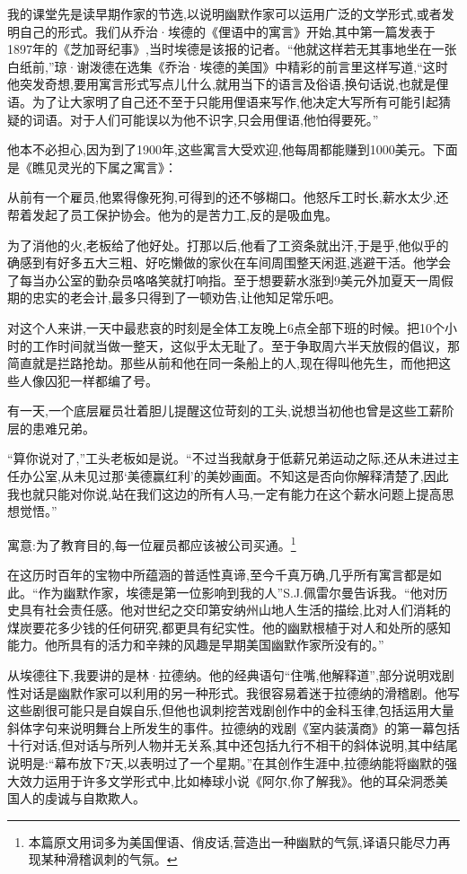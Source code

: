 我的课堂先是读早期作家的节选,以说明幽默作家可以运用广泛的文学形式,或者发明自己的形式。我们从乔治·埃德的《俚语中的寓言》开始,其中第一篇发表于1897年的《芝加哥纪事》,当时埃德是该报的记者。“他就这样若无其事地坐在一张白纸前,”琼·谢泼德在选集《乔治·埃德的美国》中精彩的前言里这样写道,“这时他突发奇想,要用寓言形式写点儿什么,就用当下的语言及俗语,换句话说,也就是俚语。为了让大家明了自己还不至于只能用俚语来写作,他决定大写所有可能引起猜疑的词语。对于人们可能误以为他不识字,只会用俚语,他怕得要死。”

他本不必担心,因为到了1900年,这些寓言大受欢迎,他每周都能赚到1000美元。下面是《瞧见灵光的下属之寓言》：

从前有一个雇员,他累得像死狗,可得到的还不够糊口。他怒斥工时长,薪水太少,还帮着发起了员工保护协会。他为的是苦力工,反的是吸血鬼。

为了消他的火,老板给了他好处。打那以后,他看了工资条就出汗,于是乎,他似乎的确感到有好多五大三粗、好吃懒做的家伙在车间周围整天闲逛,逃避干活。他学会了每当办公室的勤杂员咯咯笑就打响指。至于想要薪水涨到9美元外加夏天一周假期的忠实的老会计,最多只得到了一顿劝告,让他知足常乐吧。

对这个人来讲,一天中最悲哀的时刻是全体工友晚上6点全部下班的时候。把10个小时的工作时间就当做一整天，这似乎太无耻了。至于争取周六半天放假的倡议，那简直就是拦路抢劫。那些从前和他在同一条船上的人,现在得叫他先生，而他把这些人像囚犯一样都编了号。

有一天,一个底层雇员壮着胆儿提醒这位苛刻的工头,说想当初他也曾是这些工薪阶层的患难兄弟。

“算你说对了,”工头老板如是说。“不过当我献身于低薪兄弟运动之际,还从未进过主任办公室,从未见过那‘美德赢红利’的美妙画面。不知这是否向你解释清楚了,因此我也就只能对你说,站在我们这边的所有人马,一定有能力在这个薪水问题上提高思想觉悟。”

寓意:为了教育目的,每一位雇员都应该被公司买通。\footnote{本篇原文用词多为美国俚语、俏皮话,营造出一种幽默的气氛,译语只能尽力再现某种滑稽讽刺的气氛。}

在这历时百年的宝物中所蕴涵的普适性真谛,至今千真万确,几乎所有寓言都是如此。“作为幽默作家，埃德是第一位影响到我的人”S.J.佩雷尔曼告诉我。“他对历史具有社会责任感。他对世纪之交印第安纳州山地人生活的描绘,比对人们消耗的煤炭要花多少钱的任何研究,都更具有纪实性。他的幽默根植于对人和处所的感知能力。他所具有的活力和辛辣的风趣是早期美国幽默作家所没有的。”

从埃德往下,我要讲的是林·拉德纳。他的经典语句“住嘴,他解释道”,部分说明戏剧性对话是幽默作家可以利用的另一种形式。我很容易着迷于拉德纳的滑稽剧。他写这些剧很可能只是自娱自乐,但他也讽刺挖苦戏剧创作中的金科玉律,包括运用大量斜体字句来说明舞台上所发生的事件。拉德纳的戏剧《室内装潢商》的第一幕包括十行对话,但对话与所列人物并无关系,其中还包括九行不相干的斜体说明,其中结尾说明是:“幕布放下7天,以表明过了一个星期。”在其创作生涯中,拉德纳能将幽默的强大效力运用于许多文学形式中,比如棒球小说《阿尔,你了解我》。他的耳朵洞悉美国人的虔诚与自欺欺人。

